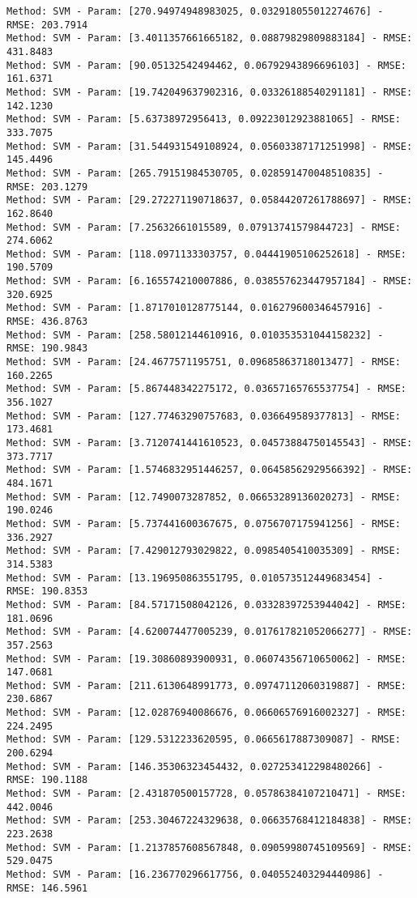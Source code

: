 \documentclass[11pt]{article}
\begin{document}
\begin{Verbatim}[commandchars=\\\{\},fontsize=\small]
Method: SVM - Param: [270.94974948983025, 0.032918055012274676] - RMSE: 203.7914
Method: SVM - Param: [3.4011357661665182, 0.08879829809883184] - RMSE: 431.8483
Method: SVM - Param: [90.05132542494462, 0.06792943896696103] - RMSE: 161.6371
Method: SVM - Param: [19.742049637902316, 0.03326188540291181] - RMSE: 142.1230
Method: SVM - Param: [5.63738972956413, 0.09223012923881065] - RMSE: 333.7075
Method: SVM - Param: [31.544931549108924, 0.05603387171251998] - RMSE: 145.4496
Method: SVM - Param: [265.79151984530705, 0.028591470048510835] - RMSE: 203.1279
Method: SVM - Param: [29.272271190718637, 0.05844207261788697] - RMSE: 162.8640
Method: SVM - Param: [7.25632661015589, 0.07913741579844723] - RMSE: 274.6062
Method: SVM - Param: [118.0971133303757, 0.04441905106252618] - RMSE: 190.5709
Method: SVM - Param: [6.165574210007886, 0.038557623447957184] - RMSE: 320.6925
Method: SVM - Param: [1.8717010128775144, 0.016279600346457916] - RMSE: 436.8763
Method: SVM - Param: [258.58012144610916, 0.010353531044158232] - RMSE: 190.9843
Method: SVM - Param: [24.4677571195751, 0.09685863718013477] - RMSE: 160.2265
Method: SVM - Param: [5.867448342275172, 0.03657165765537754] - RMSE: 356.1027
Method: SVM - Param: [127.77463290757683, 0.036649589377813] - RMSE: 173.4681
Method: SVM - Param: [3.7120741441610523, 0.04573884750145543] - RMSE: 373.7717
Method: SVM - Param: [1.5746832951446257, 0.06458562929566392] - RMSE: 484.1671
Method: SVM - Param: [12.7490073287852, 0.06653289136020273] - RMSE: 190.0246
Method: SVM - Param: [5.737441600367675, 0.0756707175941256] - RMSE: 336.2927
Method: SVM - Param: [7.429012793029822, 0.0985405410035309] - RMSE: 314.5383
Method: SVM - Param: [13.196950863551795, 0.010573512449683454] - RMSE: 190.8353
Method: SVM - Param: [84.57171508042126, 0.03328397253944042] - RMSE: 181.0696
Method: SVM - Param: [4.620074477005239, 0.017617821052066277] - RMSE: 357.2563
Method: SVM - Param: [19.30860893900931, 0.06074356710650062] - RMSE: 147.0681
Method: SVM - Param: [211.6130648991773, 0.09747112060319887] - RMSE: 230.6867
Method: SVM - Param: [12.02876940086676, 0.06606576916002327] - RMSE: 224.2495
Method: SVM - Param: [129.5312233620595, 0.0665617887309087] - RMSE: 200.6294
Method: SVM - Param: [146.35306323454432, 0.027253412298480266] - RMSE: 190.1188
Method: SVM - Param: [2.431870500157728, 0.05786384107210471] - RMSE: 442.0046
Method: SVM - Param: [253.30467224329638, 0.06635768412184838] - RMSE: 223.2638
Method: SVM - Param: [1.2137857608567848, 0.09059980745109569] - RMSE: 529.0475
Method: SVM - Param: [16.236770296617756, 0.040552403294440986] - RMSE: 146.5961

\end{Verbatim}
\end{document}
